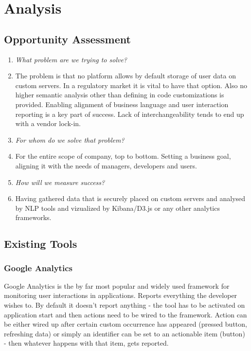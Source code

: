 \chapter{Analysis}

\section{Opportunity Assessment}
\begin{enumerate}
	\item \emph{What problem are we trying to solve?}
	\item[] The problem is that no platform allows by default storage of user data on custom servers. In a regulatory market it is vital to have that option. Also no higher semantic analysis other than defining in code customizations is provided. Enabling alignment of business language and user interaction reporting is a key part of success. Lack of interchangeability tends to end up with a vendor lock-in.
	
	\item \emph{For whom do we solve that problem?}
	\item[] 	For the entire scope of company, top to bottom. Setting a business goal, aligning it with the needs of managers, developers and users.
	
	\item \emph{How will we measure success?}
	\item[] Having gathered data that is securely placed on custom servers and analysed by NLP tools and vizualized by Kibana/D3.js or any other analytics frameworks.
\end{enumerate}

\section{Existing Tools}

\subsection{Google Analytics}

Google Analytics is the by far most popular and widely used framework for monitoring user interactions in applications. Reports everything the developer wishes to. By default it doesn't report anything - the tool has to be activated on application start and then actions need to be wired to the framework. Action can be either wired up after certain custom occurrence has appeared (pressed button, refreshing data) or simply an identifier can be set to an actionable item (button) - then whatever happens with that item, gets reported.

